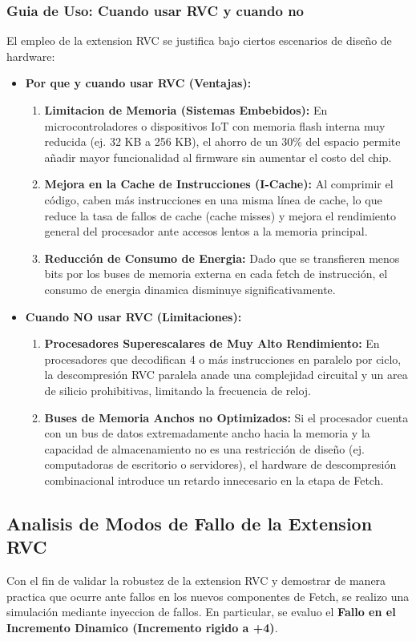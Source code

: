 \documentclass[12pt, a4paper]{article}
\begin{document}
\subsubsection{Guia de Uso: Cuando usar RVC y cuando no}
El empleo de la extension RVC se justifica bajo ciertos escenarios de diseño de hardware:
\begin{itemize}
    \item \textbf{Por que y cuando usar RVC (Ventajas):}
    \begin{enumerate}
        \item \textbf{Limitacion de Memoria (Sistemas Embebidos):} En microcontroladores o dispositivos IoT con memoria flash interna muy reducida (ej. 32 KB a 256 KB), el ahorro de un 30\% del espacio permite añadir mayor funcionalidad al firmware sin aumentar el costo del chip.
        \item \textbf{Mejora en la Cache de Instrucciones (I-Cache):} Al comprimir el código, caben más instrucciones en una misma línea de cache, lo que reduce la tasa de fallos de cache (cache misses) y mejora el rendimiento general del procesador ante accesos lentos a la memoria principal.
        \item \textbf{Reducción de Consumo de Energia:} Dado que se transfieren menos bits por los buses de memoria externa en cada fetch de instrucción, el consumo de energia dinamica disminuye significativamente.
    \end{enumerate}
    
    \item \textbf{Cuando NO usar RVC (Limitaciones):}
    \begin{enumerate}
        \item \textbf{Procesadores Superescalares de Muy Alto Rendimiento:} En procesadores que decodifican 4 o más instrucciones en paralelo por ciclo, la descompresión RVC paralela anade una complejidad circuital y un area de silicio prohibitivas, limitando la frecuencia de reloj.
        \item \textbf{Buses de Memoria Anchos no Optimizados:} Si el procesador cuenta con un bus de datos extremadamente ancho hacia la memoria y la capacidad de almacenamiento no es una restricción de diseño (ej. computadoras de escritorio o servidores), el hardware de descompresión combinacional introduce un retardo innecesario en la etapa de Fetch.
    \end{enumerate}
\end{itemize}

\subsection{Analisis de Modos de Fallo de la Extension RVC}
Con el fin de validar la robustez de la extension RVC y demostrar de manera practica que ocurre ante fallos en los nuevos componentes de Fetch, se realizo una simulación mediante inyeccion de fallos. En particular, se evaluo el \textbf{Fallo en el Incremento Dinamico (Incremento rigido a +4)}.
\end{document}

